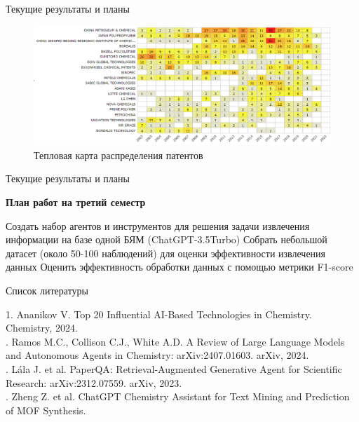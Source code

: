 \documentclass{beamer}
\begin{document}
	\begin{frame}{Текущие результаты и планы}
		
	\begin{figure}
		\centering
		\includegraphics[width=1\linewidth]{images/patent_data_heatmap}
		\caption{Тепловая карта распределения патентов}
		\label{fig:patentdataheatmap}
	\end{figure}
		\end{frame}

\begin{frame}{Текущие результаты и планы}
	
	\textbf{План работ на третий семестр}\\
	\begin{outline} 
		\1 Создать набор агентов и инструментов для решения задачи извлечения информации на базе одной БЯМ (ChatGPT-3.5Turbo)
		\1 Собрать небольшой датасет (около 50-100 наблюдений) для оценки эффективности извлечения данных 
		\1 Оценить эффективность обработки данных с помощью метрики F1-score
	\end{outline}
\end{frame}
	\begin{frame}{Список литературы}

			1. Ananikov V. Top 20 Influential AI-Based Technologies in Chemistry. Chemistry, 2024.\\. Ramos M.C., Collison C.J., White A.D. A Review of Large Language Models and Autonomous Agents in Chemistry: arXiv:2407.01603. arXiv, 2024.\\. Lála J. et al. PaperQA: Retrieval-Augmented Generative Agent for Scientific Research: arXiv:2312.07559. arXiv, 2023.\\. Zheng Z. et al. ChatGPT Chemistry Assistant for Text Mining and Prediction of MOF Synthesis.
	
	
	\end{frame}
\begin{frame}
\end{frame}
	
\end{document}
